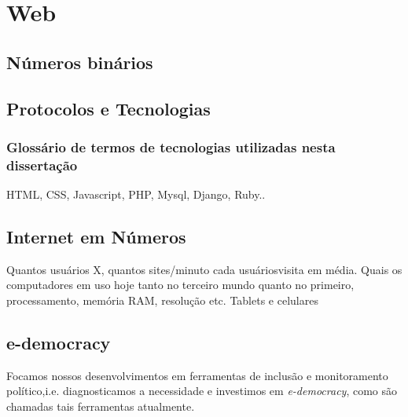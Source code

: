 \section{Web}

\subsection{Números binários}

\subsection{Protocolos e Tecnologias}

\subsubsection{Glossário de termos de tecnologias utilizadas nesta dissertação}
HTML, CSS, Javascript, PHP, Mysql, Django, Ruby..

\subsection{Internet em Números}
Quantos usuários X, quantos sites/minuto cada usuáriosvisita em média.
Quais os computadores em uso hoje tanto no terceiro mundo quanto no primeiro,
processamento, memória RAM, resolução etc.
Tablets e celulares

\subsection{e-democracy}
Focamos nossos desenvolvimentos em ferramentas de inclusão
e monitoramento político,i.e. diagnosticamos a necessidade
e investimos em \emph{e-democracy}, como são chamadas tais ferramentas atualmente.
